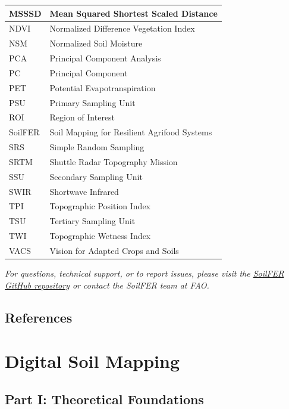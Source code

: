 \documentclass[
  10pt,
  b5paper,
  oneside]{book}
\begin{document}
\begin{table}
\begin{tabular}[t]{l|l}
\hline
MSSSD & Mean Squared Shortest Scaled Distance\\
\hline
NDVI & Normalized Difference Vegetation Index\\
\hline
NSM & Normalized Soil Moisture\\
\hline
PCA & Principal Component Analysis\\
\hline
PC & Principal Component\\
\hline
PET & Potential Evapotranspiration\\
\hline
PSU & Primary Sampling Unit\\
\hline
ROI & Region of Interest\\
\hline
SoilFER & Soil Mapping for Resilient Agrifood Systems\\
\hline
SRS & Simple Random Sampling\\
\hline
SRTM & Shuttle Radar Topography Mission\\
\hline
SSU & Secondary Sampling Unit\\
\hline
SWIR & Shortwave Infrared\\
\hline
TPI & Topographic Position Index\\
\hline
TSU & Tertiary Sampling Unit\\
\hline
TWI & Topographic Wetness Index\\
\hline
VACS & Vision for Adapted Crops and Soils\\
\hline
\end{tabular}
\end{table}

\emph{For questions, technical support, or to report issues, please visit the \href{https://github.com/SoilFER/SoilFER-Training-Manual}{SoilFER GitHub repository} or contact the SoilFER team at FAO.}

\section*{References}\label{references-2}

\chapter{Digital Soil Mapping}\label{digital-soil-mapping}

\section*{Part I: Theoretical Foundations}\label{part-i-theoretical-foundations}
\end{document}
